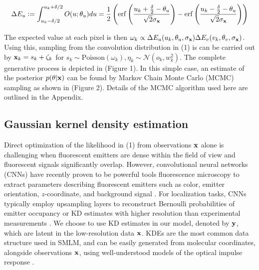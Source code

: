 \documentclass{article}
\begin{document}
\begin{equation}
\Delta E_{u} \vcentcolon = \int_{u_{k}-\delta /2}^{u_{k}+\delta /2} O(u;\theta_{u})du = \frac{1}{2}\left(\mathrm{erf}\left(\frac{u_{k}+\frac{\delta}{2}-\theta_{u}}{\sqrt{2}\sigma_{\bold{x}}}\right) -\mathrm{erf}\left(\frac{u_{k}-\frac{\delta}{2}-\theta_{u}}{\sqrt{2}\sigma_{\bold{x}}}\right)\right)
\end{equation}

The expected value at each pixel is then $\omega_{k}\propto \Delta E_{u}(u_{k},\theta_{u},\sigma_{\bold{x}})\Delta E_{v}(v_{k},\theta_{v},\sigma_{\bold{x}}) $. Using this, sampling from the convolution distribution in (1) is can be carried out by $\bold{x}_{k} = s_{k} + \zeta_{k}$ for $s_{k}\sim \mathrm{Poisson}(\omega_{k}), \eta_{k}\sim \mathcal{N}(o_{k},w_{k}^{2})$. The complete generative process is depicted in (Figure 1). In this simple case, an estimate of the posterior $p(\theta|\bold{x})$ can be found by Markov Chain Monte Carlo (MCMC) sampling as shown in (Figure 2). Details of the MCMC algorithm used here are outlined in the Appendix.

\subsection{Gaussian kernel density estimation}

Direct optimization of the likelihood in (1) from observations $\bold{x}$ alone is challenging when fluorescent emitters are dense within the field of view and fluorescent signals significantly overlap. However, convolutional neural networks (CNNs) have recently proven to be powerful tools fluorescence microscopy to extract parameters describing fluorescent emitters such as color, emitter orientation, $z$-coordinate, and background signal \cite{Zhang2018,Kim2019,Zelger2018}. For localization tasks, CNNs typically employ upsampling layers to reconstruct Bernoulli probabilities of emitter occupancy \citep{Speiser2021} or KD estimates with higher resolution than experimental measurements \citep{Nehme2020}. We choose to use KD estimates in our model, denoted by $\bold{y}$, which are latent in the low-resolution data $\bold{x}$. KDEs are the most common data structure used in SMLM, and can be easily generated from molecular coordinates, alongside observations $\bold{x}$, using well-understood models of the optical impulse response \citep{Zhang2007}. 
\end{document}
